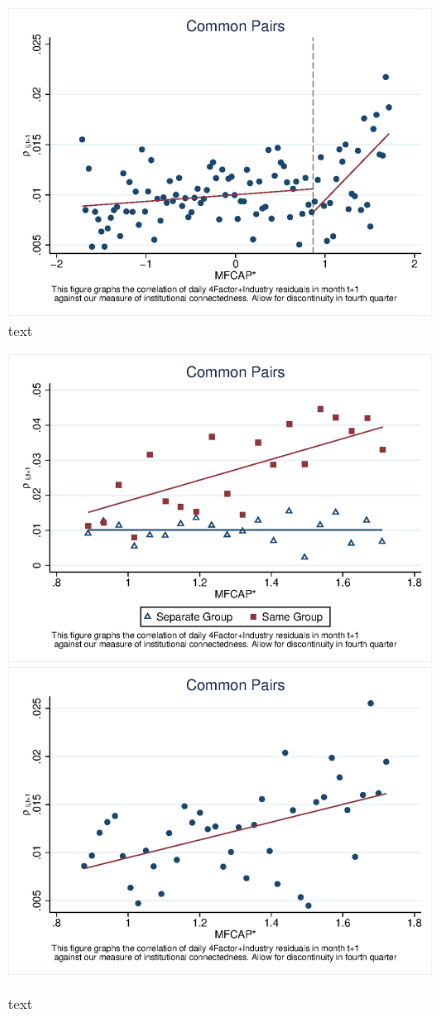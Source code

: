 \documentclass[12pt, a4paper]{article}
\begin{document}
\begin{itemize}
	\begin{figure}[htbp]
		\centering  
		\includegraphics[width=0.6\linewidth]{"Output/Qmcorr5lrd.eps"}
		\caption{text}
		\label{Qmcorr5lrd}
	\end{figure}
	\begin{figure}[htbp]
		\centering  
		\includegraphics[width=0.45\linewidth]{"Output/Qmcorr5lrdbgsubsample.eps"}
		\includegraphics[width=0.45\linewidth]{"Output/Qmcorr5subsample.eps"}
		\caption{text}
		\label{Qmcorr5subsample}
	\end{figure}


\end{itemize}
\end{document}
